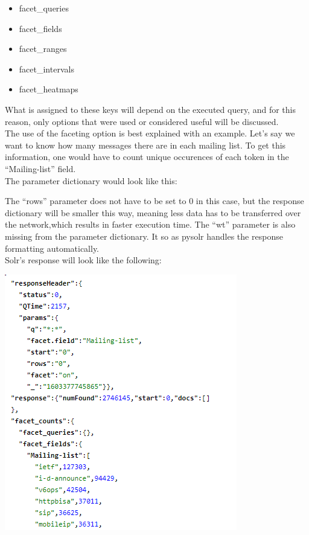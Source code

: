 \documentclass[a4paper,english]{report}
\begin{document}
\begin{itemize}

\item facet\_queries
\item facet\_fields
\item facet\_ranges
\item facet\_intervals
\item facet\_heatmaps

\end{itemize}

What is assigned to these keys will depend on the executed query, and for this reason, only options that were used or considered useful will be discussed.\\

The use of the faceting option is best explained with an example.
Let's say we want to know how many messages there are in each mailing list.
To get this information, one would have to count unique occurences of each token in the “Mailing-list” field.\\

The parameter dictionary would look like this: 



The “rows” parameter does not have to be set to 0 in this case, but the response dictionary will be smaller this way, meaning less data has to be transferred over the network,which results in faster execution time. The “wt” parameter is also missing from the parameter dictionary.  It so as pysolr handles the response formatting automatically.\\

Solr’s response will look like the following: 

\includegraphics{gui4}
\end{document}
